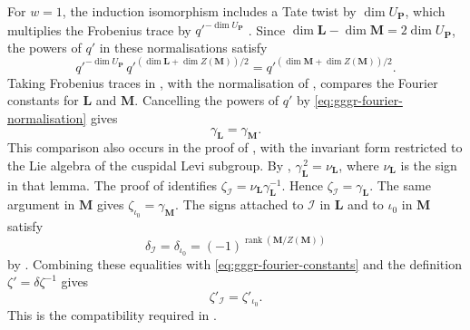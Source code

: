 \documentclass[10pt]{amsart}
\theoremstyle{definition}
\let\oldendproof\endproof
\renewenvironment{proof}[1][\proofname]{%
  \oldproof[\bfseries #1]%
}{\oldendproof}
\numberwithin{equation}{section}
\numberwithin{table}{section}
\begin{document}
\begin{proof}[Proof of Lemma~\ref{lem:type-b-isolated-coverage}]
For $w=1$, the induction isomorphism \cite[(6.2.11)]{Letellier2005}
includes a Tate twist by $\dim U_{\mathbf P}$, which multiplies the
Frobenius trace by $q'^{-\dim U_{\mathbf P}}$
\cite[Remark~4.4.6]{Letellier2005}.
Since $\dim\mathbf L-\dim\mathbf M=2\dim U_{\mathbf P}$, the powers
of $q'$ in these normalisations satisfy
\begin{equation}\label{eq:gggr-fourier-normalisation}
 q'^{-\dim U_{\mathbf P}}\,
 q'^{(\dim\mathbf L+\dim Z(\mathbf M))/2}
 =q'^{(\dim\mathbf M+\dim Z(\mathbf M))/2}.
\end{equation}
Taking Frobenius traces in \cite[(6.2.11)]{Letellier2005}, with the
normalisation of \cite[Lemma~11.3]{Taylor2016}, compares the Fourier
constants for $\mathbf L$ and $\mathbf M$.
Cancelling the powers of $q'$ by \eqref{eq:gggr-fourier-normalisation}
gives
\begin{equation}\label{eq:gggr-fourier-constants}
 \gamma_{\mathbf L}=\gamma_{\mathbf M}.
\end{equation}
This comparison also occurs in the proof of
\cite[Proposition~7.2]{Lusztig1992Support}, with the invariant form
restricted to the Lie algebra of the cuspidal Levi subgroup.
By \cite[Lemma~11.3]{Taylor2016},
$\gamma_{\mathbf L}^{\,2}=\nu_{\mathbf L}$, where
$\nu_{\mathbf L}$ is the sign in that lemma.
The proof of \cite[Proposition~11.5]{Taylor2016} identifies
$\zeta_{\mathcal I}=\nu_{\mathbf L}\gamma_{\mathbf L}^{-1}$.
Hence $\zeta_{\mathcal I}=\gamma_{\mathbf L}$.
The same argument in $\mathbf M$ gives
$\zeta_{\iota_0}=\gamma_{\mathbf M}$.
The signs attached to $\mathcal I$ in $\mathbf L$ and to $\iota_0$
in $\mathbf M$ satisfy
\[
 \delta_{\mathcal I}=\delta_{\iota_0}
 =(-1)^{\operatorname{rank}(\mathbf M/Z(\mathbf M))}
\]
by \cite[(8.4)(a)]{Lusztig1992Support}.
Combining these equalities with \eqref{eq:gggr-fourier-constants} and
the definition $\zeta'=\delta\zeta^{-1}$ gives
\begin{equation}\label{eq:gggr-cuspidal-compatibility}
 \zeta'_{\mathcal I}=\zeta'_{\iota_0}.
\end{equation}
This is the compatibility required in \cite[(3.3)(b)]{Geck1999GGGR}.


\end{proof}
\end{document}
